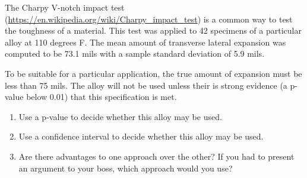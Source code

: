 \documentclass[twoside]{book}\usepackage[]{graphicx}\usepackage[]{xcolor}
\begin{document}
\begin{problem}
	The Charpy V-notch impact test (\url{https://en.wikipedia.org/wiki/Charpy_impact_test})
	is a common way to test the toughness of a material.
	This test was applied to 42 specimens of a particular alloy at 110 degrees F.
	The mean amount of transverse lateral expansion was computed to be
	73.1 mils with a sample standard deviation of 5.9 mils.

	To be suitable for a particular application, the true amount of expansion must be less than 75 mils.
	The alloy will not be used unless their is strong evidence (a p-value below 0.01) that 
	this specification is met.

	\begin{enumerate}
		\item
			Use a p-value to decide whether this alloy may be used.
		\item
			Use a confidence interval to decide whether this alloy may be used.
		\item
			Are there advantages to one approach over the other?  If you had to present
			an argument to your boss, which approach would you use?
	\end{enumerate}
\end{problem}
\end{document}
